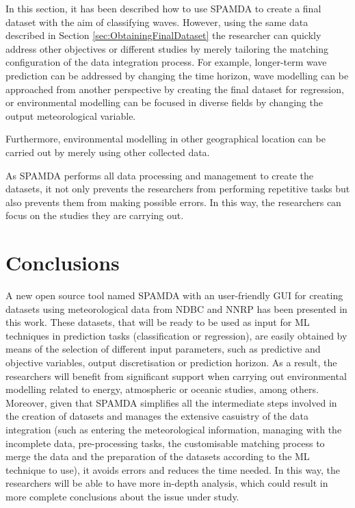 \documentclass[review]{elsarticle}
\begin{document}
			In this section, it has been described how to use SPAMDA to create a final dataset with the aim of classifying waves. However, using the same data described in Section \ref{sec:ObtainingFinalDataset} the researcher can quickly address other objectives or different studies by merely tailoring the matching configuration of the data integration process. For example, longer-term wave prediction can be addressed by changing the time horizon, wave modelling can be approached from another perspective by creating the final dataset for regression, or environmental modelling can be focused in diverse fields by changing the output meteorological variable.

			Furthermore, environmental modelling in other geographical location can be carried out by merely using other collected data.
			
			As SPAMDA performs all data processing and management to create the datasets, it not only prevents the researchers from performing repetitive tasks but also prevents them from making possible errors. In this way, the researchers can focus on the studies they are carrying out.
		
	\section{Conclusions}\label{sec:Conclusions}

		A new open source tool named SPAMDA with an user-friendly GUI for creating datasets using meteorological data from NDBC and NNRP has been presented in this work. These datasets, that will be ready to be used as input for ML techniques in prediction tasks (classification or regression), are easily obtained by means of the selection of different input parameters, such as predictive and objective variables, output discretisation or prediction horizon. As a result, the researchers will benefit from significant support when carrying out environmental modelling related to energy, atmospheric or oceanic studies, among others. Moreover, given that SPAMDA simplifies all the intermediate steps involved in the creation of datasets and manages the extensive casuistry of the data integration (such as entering the meteorological information, managing with the incomplete data, pre-processing tasks, the customisable matching process to merge the data and the preparation of the datasets according to the ML technique to use), it avoids errors and reduces the time needed. In this way, the researchers will be able to have more in-depth analysis, which could result in more complete conclusions about the issue under study.
\end{document}
